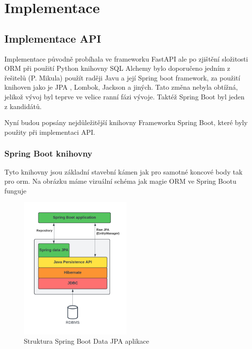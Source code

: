 \chapter{Implementace}

\section{Implementace API}
Implementace původně probíhala ve frameworku FastAPI  ale po zjištění složitosti ORM při použití Python knihovny SQL Alchemy bylo doporučeno jedním z řešitelů (P. Mikula)
použít raději Javu a její Spring boot framework, za použití knihoven jako je JPA , Lombok, Jackson a jiných. Tato změna nebyla obtížná, jelikož vývoj byl teprve ve velice ranní fázi vývoje. Taktéž Spring Boot byl jeden z kandidátů.

Nyní budou popsány nejdůležitější knihovny Frameworku Spring Boot, které byly použity při implementaci API.


\subsection{Spring Boot knihovny}\label{sec:impl:spring} 

Tyto knihovny jsou základní stavební kámen jak pro samotné koncové body tak pro \gls{orm}. Na obrázku  máme vizuální schéma jak magie ORM ve Spring Bootu funguje

\begin{figure}[ht!]
    \centering
    \includegraphics[width=0.5\textwidth]{figures/impl/API Implementation - JPA.pdf}
    \caption{Struktura Spring Boot Data JPA aplikace}
    \label{fig:JPA}
\end{figure}


